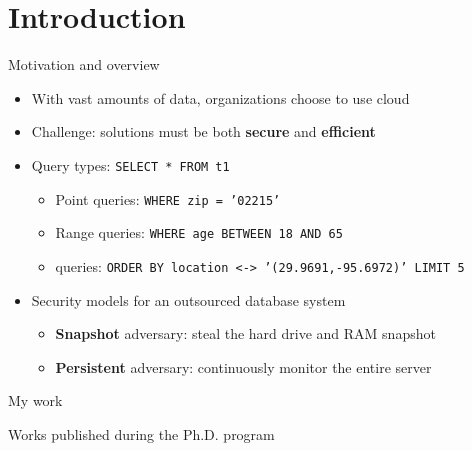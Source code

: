 \section{Introduction}

	\begin{frame}{Motivation and overview}

		\begin{itemize}
			\item<1-> With vast amounts of data, organizations choose to use cloud
			\item<1-> \alert{Challenge:} solutions must be both \textbf{secure} and \textbf{efficient}
			\item<2-> Query types: \texttt{SELECT * FROM t1 }
				\begin{itemize}
					\item<1,2,5-> Point queries: \texttt{WHERE zip = '02215'}
					\item<1,3,5-> Range queries: \texttt{WHERE age BETWEEN 18 AND 65}
					\item<1,4,5-> \knn{} queries: \texttt{ORDER BY location <-> '(29.9691,-95.6972)' LIMIT 5} %
				\end{itemize}
			\item<5-> Security models for an outsourced database system
				\begin{itemize}
					\item<1-4,5> \textbf{Snapshot} adversary: steal the hard drive and RAM snapshot %
					\item<1-4,6> \textbf{Persistent} adversary: continuously monitor the entire server %
				\end{itemize}
		\end{itemize}

	\end{frame}

	\newlength{\citationLength}

	\begin{frame}{My work}

		\begin{block}{Works published during the Ph.D. program}

			\vspace*{1ex}

			\begin{description}[
				leftmargin=\dimexpr\citationLength+0.5em\relax,
				labelindent=0pt,
				labelwidth=\citationLength%
			]
				\setlength\itemsep{1ex}
				\item<1>[\cite{ore-benchmark-17}] 
				\item<2>[\cite{epsolute}] 
				\item<3>[\cite{k-anon}] 
				\item<4>[\cite{bogatov-idemix-2020}] 
			\end{description}

		\end{block}

	\end{frame}
